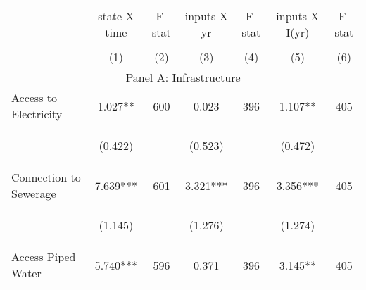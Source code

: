 \begin{tabular}{lcccccc}


\toprule


\multicolumn{1}{l}{} & \multicolumn{1}{c}{state X time} & \multicolumn{1}{c}{F-stat} & \multicolumn{1}{c}{inputs X yr} & \multicolumn{1}{c}{F-stat} & \multicolumn{1}{c}{inputs X I(yr)} & \multicolumn{1}{c}{F-stat}  \\

\cmidrule(l{1mm}r{1mm}){2-3} \cmidrule(l{1mm}r{1mm}){4-5} \cmidrule(l{1mm}r{1mm}){6-7}   \\

 & (1) & (2) & (3) & (4) & (5) & (6)  \\ 
 

\hline

\multicolumn{7}{c}{Panel A: Infrastructure}   \\                                                          

Access to Electricity   	&  1.027**   
				&  600  
				&   0.023  
				&  396 
				&  1.107**  
				&  405 \\

\vspace{4pt} &  \begin{footnotesize}(0.422)\end{footnotesize}   & &
			    \begin{footnotesize}(0.523)\end{footnotesize}   & &
			    \begin{footnotesize}(0.472)\end{footnotesize}   & \\          


Connection to Sewerage   &  7.639***   &  601  &   3.321***  &  396 &  3.356***  &  405   \\

\vspace{4pt} &  \begin{footnotesize}(1.145)\end{footnotesize}   & &
			    \begin{footnotesize}(1.276)\end{footnotesize}   & &
			    \begin{footnotesize}(1.274)\end{footnotesize}   &
			     \\          


Access Piped Water   &  5.740***   &  596  &   0.371  &  396 &  3.145**  &  405   \\



\end{tabular}
